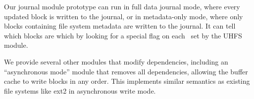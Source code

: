 

Our journal module prototype can run in full data journal mode, where every
updated block is written to the journal, or in metadata-only mode, where only
blocks containing file system metadata are written to the journal. It can
tell which blocks are which by looking for a special flag on each \patch\ set
by the UHFS module.

We provide several other modules that modify dependencies, including an
``asynchronous mode'' module that removes all dependencies, allowing the
buffer cache to write blocks in any order.
%
This implements similar semantics as existing file systems like ext2 in
asynchronous write mode.
